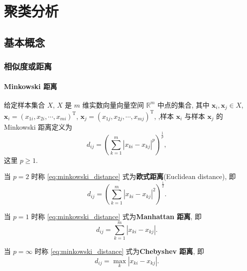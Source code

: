\section{聚类分析}
\subsection{基本概念}
\subsubsection{相似度或距离}
\paragraph{Minkowski 距离}

\begin{definition}
  给定样本集合 \(X\), \(X\) 是 \(m\) 维实数向量向量空间 \(\mathbb{R}^m\) 中点的集合, 其中 \(\boldsymbol{x}_i,\boldsymbol{x}_j\in X\), \(\boldsymbol{x}_i=\left(x_{1i}, x_{2i},\cdots,x_{mi}\right)^\mathrm{T}\), \(\boldsymbol{x}_j=\left(x_{1j}, x_{2j},\cdots, x_{mj}\right)^\mathrm{T}\), ,样本 \(\boldsymbol{x}_i\) 与样本 \(\boldsymbol{x}_j\) 的 Minkowski 距离定义为
  \begin{equation}
  d_{ij}=\left(\sum_{k=1}^{m} \left\lvert x_{ki}-x_{kj}\right\rvert^p\right)^{\frac{1}{p}},
  \label{eq:minkowski_distance}
  \end{equation}
  这里 \(p\ge 1\).
\end{definition}

当 \(p=2\) 时称 \eqref{eq:minkowski_distance} 式为\textbf{欧式距离}(Euclidean distance), 即
\begin{equation*}
  d_{ij}=\left(\sum_{k=1}^{m} \left\lvert x_{ki}-x_{kj}\right\rvert^2\right)^{\frac{1}{2}}.
\end{equation*}

当 \(p=1\) 时称 \eqref{eq:minkowski_distance} 式为\textbf{Manhattan 距离}, 即
\begin{equation*}
  d_{ij}=\sum_{k=1}^{m} \left\lvert x_{ki}-x_{kj}\right\rvert.
\end{equation*}

当 \(p=\infty\) 时称 \eqref{eq:minkowski_distance} 式为\textbf{Chebyshev 距离}, 即
\begin{equation*}
  d_{ij}=\max_{k} \left\lvert x_{ki}-x_{kj}\right\rvert.
\end{equation*}

